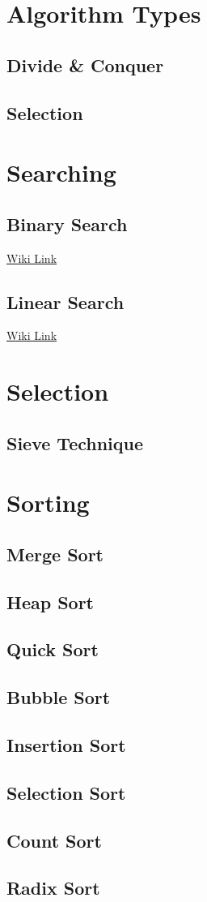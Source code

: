 \section{Algorithm Types}
\subsection{Divide \& Conquer}
\subsection{Selection}

\section{Searching}
\subsection{Binary Search}

\href{https://en.wikipedia.org/wiki/Binary_search_algorithm}{Wiki Link}

\subsection{Linear Search}

\href{https://en.wikipedia.org/wiki/Linear_search}{Wiki Link}

\section{Selection}
\subsection{Sieve Technique}

\section{Sorting}
\subsection{Merge Sort}
\subsection{Heap Sort}
\subsection{Quick Sort}
\subsection{Bubble Sort}
\subsection{Insertion Sort}
\subsection{Selection Sort}
\subsection{Count Sort}
\subsection{Radix Sort}
